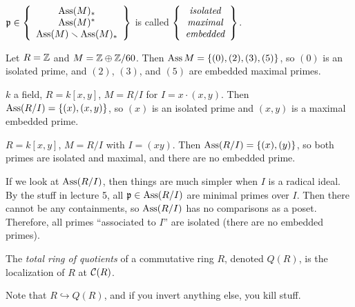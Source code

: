  \setcounter{lecture}{11}

 \begin{definition}
   $\mathfrak{p}\in \left\{\begin{array}{c}\operatorname{Ass} (M)_* \\ \operatorname{Ass}(M)^*\\ \operatorname{Ass} (M)\smallsetminus
   \operatorname{Ass}(M)_*\end{array} \right\}$ is called $\left\{\begin{array}{c}\emph{isolated}
   \\
   \emph{maximal}\\ \emph{embedded}\end{array} \right\}$.
 \end{definition}
 \begin{example}
   Let $R=\mathbb{Z}$ and $M=\mathbb{Z}\oplus \mathbb{Z}/60$. Then $\operatorname{Ass} M = \{(0),(2),(3),(5)\}$, so $(0)$ is
   an isolated prime, and $(2)$, $(3)$, and $(5)$ are embedded maximal primes.
 \end{example}
 \begin{example}
   $k$ a field, $R=k[x,y]$, $M=R/I$ for $I=x\cdot (x,y)$. Then $\operatorname{Ass}
   (R/I)=\{(x),(x,y)\}$, so $(x)$ is an isolated prime and $(x,y)$ is a maximal embedded
   prime.
 \end{example}
 \begin{example}
   $R=k[x,y]$, $M=R/I$ with $I=(xy)$. Then $\operatorname{Ass} (R/I)=\{(x),(y)\}$, so both primes are
   isolated and maximal, and there are no embedded prime.
 \end{example}

 If we look at $\operatorname{Ass} (R/I)$, then things are much simpler when $I$ is a radical ideal. By
 the stuff in lecture 5, all $\mathfrak{p}\in \operatorname{Ass}(R/I)$ are minimal primes over $I$. Then there
 cannot be any containments, so $\operatorname{Ass}(R/I)$ has no comparisons as a poset. Therefore, all
 primes ``associated to $I$'' are isolated (there are no embedded primes).

 \begin{definition}
   The \emph{total ring of quotients} of a commutative ring $R$, denoted $Q(R)$, is the
   localization of $R$ at $\mathcal{C}(R)$.
 \end{definition}
 Note that $R\hookrightarrow Q(R)$, and if you invert anything else, you kill stuff.

